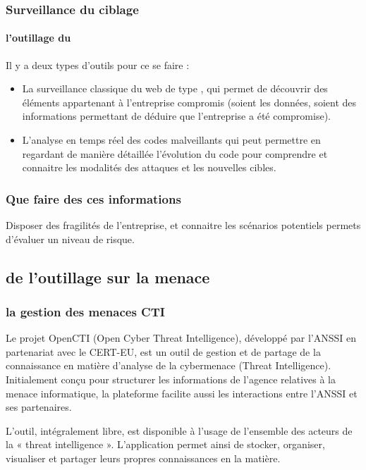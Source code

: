 \begin{frame}
\frametitle<presentation>{Surveillance du ciblage}
\framesubtitle<presentation>{l'outillage du }
Il y a deux types d'outils pour ce se faire : 

\begin{itemize}
	\item La surveillance classique du web de type , qui permet de découvrir des éléments appartenant à l'entreprise compromis (soient les données, soient des informations permettant de déduire que l'entreprise a été compromise).
	\item L'analyse en temps réel des codes malveillants qui peut permettre en regardant de manière détaillée l'évolution du code pour comprendre et connaitre les modalités des attaques et les nouvelles cibles.
\end{itemize}
\end{frame}


\subsubsection{Que faire des ces informations}

Disposer des fragilités de l'entreprise, et connaitre les scénarios potentiels permets d'évaluer un niveau de risque. 

\subsection{de l'outillage sur la menace}

\subsubsection{la gestion des menaces CTI}



Le projet OpenCTI (Open Cyber Threat Intelligence), développé par l’ANSSI en partenariat avec le CERT-EU, est un outil de gestion et de partage de la connaissance en matière d’analyse de la cybermenace (Threat Intelligence). Initialement conçu pour structurer les informations de l’agence relatives à la menace informatique, la plateforme facilite aussi les interactions entre l’ANSSI et ses partenaires.

L’outil, intégralement libre, est  disponible à l’usage de l’ensemble des acteurs de la « threat intelligence ». L’application permet ainsi de stocker, organiser, visualiser et partager leurs propres connaissances en la matière.

